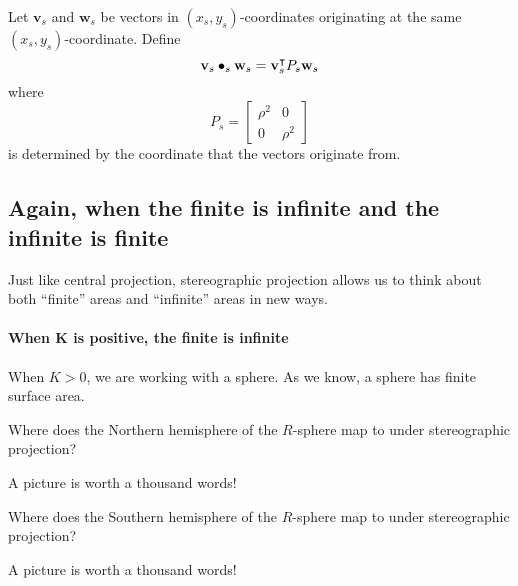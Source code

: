 \documentclass[hints,handout,12pt,noauthor,nooutcomes]{ximera}
\begin{document}
\begin{definition}
  Let $\mathbf{v}_s$ and $\mathbf{w}_s$ be vectors in $(x_s,y_s)$-coordinates
  originating at the same $(x_s,y_s)$-coordinate. Define
  \[
  \mathbf{v}_s \bullet_s \mathbf{w}_s = \mathbf{v}_s^\intercal P_s \mathbf{w}_s
  \]
  where
  \[
  P_s =
  \begin{bmatrix}
    \rho^2 & 0\\
    0 & \rho^2
  \end{bmatrix}
  \]
  is determined by the coordinate that the vectors originate from.
\end{definition}








\subsection{Again, when the finite is infinite and the infinite is finite}

Just like central projection, stereographic projection allows us to
think about both ``finite'' areas and ``infinite'' areas in new ways.

\paragraph{When $\boldsymbol K$ is positive, the finite is infinite}

When $K>0$, we are working with a sphere. As we know, a sphere has
finite surface area.



\begin{problem}
  Where does the Northern hemisphere of the $R$-sphere map to under stereographic projection?
  \begin{hint}
    A picture is worth a thousand words!
  \end{hint}
  \begin{freeResponse}
  \end{freeResponse}
\end{problem}


\begin{problem}
  Where does the Southern hemisphere of the $R$-sphere map to under stereographic projection?
  \begin{hint}
    A picture is worth a thousand words!
  \end{hint}
  \begin{freeResponse}
  \end{freeResponse}
\end{problem}
\end{document}
